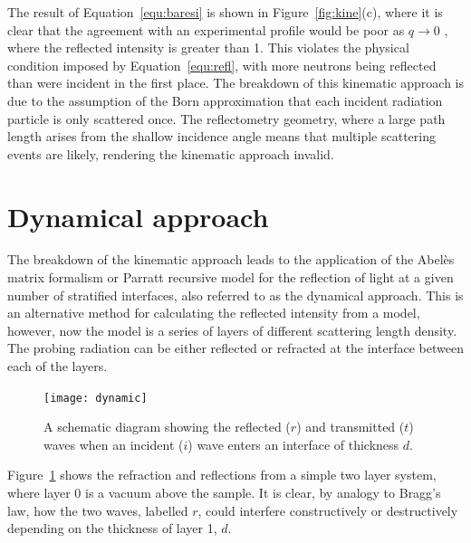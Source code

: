 \documentclass[
 reprint,
 superscriptaddress,
 amsmath,amssymb,
 aps,
]{revtex4-1}
\begin{document}
%
The result of Equation~\ref{equ:baresi} is shown in Figure~\ref{fig:kine}(c), where it is clear that the agreement with an experimental profile would be poor as $q \to 0$ \cite{majkrzak_exact_1998}, where the reflected intensity is greater than \num{1}.
This violates the physical condition imposed by Equation~\ref{equ:refl}, with more neutrons being reflected than were incident in the first place.
The breakdown of this kinematic approach is due to the assumption of the Born approximation that each incident radiation particle is only scattered once.
The reflectometry geometry, where a large path length arises from the shallow incidence angle means that multiple scattering events are likely, rendering the kinematic approach invalid.

\section{Dynamical approach}
The breakdown of the kinematic approach leads to the application of the Abel\`{e}s matrix formalism \cite{abeles_sur_1948} or Parratt \cite{parratt_surface_1954} recursive model for the reflection of light at a given number of stratified interfaces, also referred to as the dynamical approach.
This is an alternative method for calculating the reflected intensity from a model, however, now the model is a series of layers of different scattering length density.
The probing radiation can be either reflected or refracted at the interface between each of the layers.
%
\begin{figure}[t]
    \texttt{[image: dynamic]}
    \caption{A schematic diagram showing the reflected ($r$) and transmitted ($t$) waves when an incident ($i$) wave enters an interface of thickness $d$.}
    \label{fig:refr}
\end{figure}
%
Figure~\ref{fig:refr} shows the refraction and reflections from a simple two layer system, where layer \num{0} is a vacuum above the sample.
It is clear, by analogy to Bragg's law, how the two waves, labelled $r$, could interfere constructively or destructively depending on the thickness of layer \num{1}, $d$.
\end{document}
